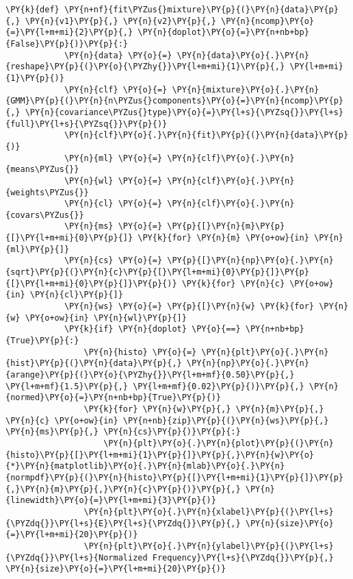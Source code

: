 \begin{Verbatim}[commandchars=\\\{\}, fontsize=\scriptsize]
        \PY{k}{def} \PY{n+nf}{fit\PYZus{}mixture}\PY{p}{(}\PY{n}{data}\PY{p}{,} \PY{n}{v1}\PY{p}{,} \PY{n}{v2}\PY{p}{,} \PY{n}{ncomp}\PY{o}{=}\PY{l+m+mi}{2}\PY{p}{,} \PY{n}{doplot}\PY{o}{=}\PY{n+nb+bp}{False}\PY{p}{)}\PY{p}{:}
            \PY{n}{data} \PY{o}{=} \PY{n}{data}\PY{o}{.}\PY{n}{reshape}\PY{p}{(}\PY{o}{\PYZhy{}}\PY{l+m+mi}{1}\PY{p}{,} \PY{l+m+mi}{1}\PY{p}{)}
            \PY{n}{clf} \PY{o}{=} \PY{n}{mixture}\PY{o}{.}\PY{n}{GMM}\PY{p}{(}\PY{n}{n\PYZus{}components}\PY{o}{=}\PY{n}{ncomp}\PY{p}{,} \PY{n}{covariance\PYZus{}type}\PY{o}{=}\PY{l+s}{\PYZsq{}}\PY{l+s}{full}\PY{l+s}{\PYZsq{}}\PY{p}{)}
            \PY{n}{clf}\PY{o}{.}\PY{n}{fit}\PY{p}{(}\PY{n}{data}\PY{p}{)}
            \PY{n}{ml} \PY{o}{=} \PY{n}{clf}\PY{o}{.}\PY{n}{means\PYZus{}}
            \PY{n}{wl} \PY{o}{=} \PY{n}{clf}\PY{o}{.}\PY{n}{weights\PYZus{}}
            \PY{n}{cl} \PY{o}{=} \PY{n}{clf}\PY{o}{.}\PY{n}{covars\PYZus{}}
            \PY{n}{ms} \PY{o}{=} \PY{p}{[}\PY{n}{m}\PY{p}{[}\PY{l+m+mi}{0}\PY{p}{]} \PY{k}{for} \PY{n}{m} \PY{o+ow}{in} \PY{n}{ml}\PY{p}{]}
            \PY{n}{cs} \PY{o}{=} \PY{p}{[}\PY{n}{np}\PY{o}{.}\PY{n}{sqrt}\PY{p}{(}\PY{n}{c}\PY{p}{[}\PY{l+m+mi}{0}\PY{p}{]}\PY{p}{[}\PY{l+m+mi}{0}\PY{p}{]}\PY{p}{)} \PY{k}{for} \PY{n}{c} \PY{o+ow}{in} \PY{n}{cl}\PY{p}{]}
            \PY{n}{ws} \PY{o}{=} \PY{p}{[}\PY{n}{w} \PY{k}{for} \PY{n}{w} \PY{o+ow}{in} \PY{n}{wl}\PY{p}{]}
            \PY{k}{if} \PY{n}{doplot} \PY{o}{==} \PY{n+nb+bp}{True}\PY{p}{:}
                \PY{n}{histo} \PY{o}{=} \PY{n}{plt}\PY{o}{.}\PY{n}{hist}\PY{p}{(}\PY{n}{data}\PY{p}{,} \PY{n}{np}\PY{o}{.}\PY{n}{arange}\PY{p}{(}\PY{o}{\PYZhy{}}\PY{l+m+mf}{0.50}\PY{p}{,} \PY{l+m+mf}{1.5}\PY{p}{,} \PY{l+m+mf}{0.02}\PY{p}{)}\PY{p}{,} \PY{n}{normed}\PY{o}{=}\PY{n+nb+bp}{True}\PY{p}{)}
                \PY{k}{for} \PY{n}{w}\PY{p}{,} \PY{n}{m}\PY{p}{,} \PY{n}{c} \PY{o+ow}{in} \PY{n+nb}{zip}\PY{p}{(}\PY{n}{ws}\PY{p}{,} \PY{n}{ms}\PY{p}{,} \PY{n}{cs}\PY{p}{)}\PY{p}{:}
                    \PY{n}{plt}\PY{o}{.}\PY{n}{plot}\PY{p}{(}\PY{n}{histo}\PY{p}{[}\PY{l+m+mi}{1}\PY{p}{]}\PY{p}{,}\PY{n}{w}\PY{o}{*}\PY{n}{matplotlib}\PY{o}{.}\PY{n}{mlab}\PY{o}{.}\PY{n}{normpdf}\PY{p}{(}\PY{n}{histo}\PY{p}{[}\PY{l+m+mi}{1}\PY{p}{]}\PY{p}{,}\PY{n}{m}\PY{p}{,}\PY{n}{c}\PY{p}{)}\PY{p}{,} \PY{n}{linewidth}\PY{o}{=}\PY{l+m+mi}{3}\PY{p}{)}
                \PY{n}{plt}\PY{o}{.}\PY{n}{xlabel}\PY{p}{(}\PY{l+s}{\PYZdq{}}\PY{l+s}{E}\PY{l+s}{\PYZdq{}}\PY{p}{,} \PY{n}{size}\PY{o}{=}\PY{l+m+mi}{20}\PY{p}{)}
                \PY{n}{plt}\PY{o}{.}\PY{n}{ylabel}\PY{p}{(}\PY{l+s}{\PYZdq{}}\PY{l+s}{Normalized Frequency}\PY{l+s}{\PYZdq{}}\PY{p}{,} \PY{n}{size}\PY{o}{=}\PY{l+m+mi}{20}\PY{p}{)}

\end{Verbatim}
